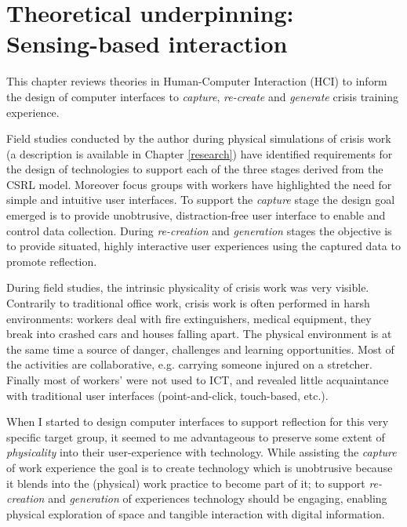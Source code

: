 \chapter{Theoretical underpinning:\\Sensing-based interaction}\label{interaction}


This chapter reviews theories in Human-Computer Interaction (HCI) to inform the design of computer interfaces to \emph{capture}, \emph{re-create} and \emph{generate} crisis training experience.

Field studies conducted by the author during physical simulations of crisis work (a description is available in Chapter \ref{research}) have identified requirements for the design of technologies to support each of the three stages derived from the CSRL model. Moreover focus groups with workers have highlighted the need for simple and intuitive user interfaces. To support the \emph{capture} stage the design goal emerged is to provide unobtrusive, distraction-free user interface to enable and control data collection. During \emph{re-creation} and \emph{generation} stages the objective is to provide situated, highly interactive user experiences using the captured data to promote reflection.

During field studies, the intrinsic physicality of crisis work was very visible. Contrarily to traditional office work, crisis work is often performed in harsh environments: workers deal with fire extinguishers, medical equipment, they break into crashed cars and houses falling apart. The physical environment is at the same time a source of danger, challenges and learning opportunities. Most of the activities are collaborative, e.g. carrying someone injured on a stretcher. Finally most of workers' were not used to ICT, and revealed little acquaintance with traditional user interfaces (point-and-click, touch-based, etc.).

When I started to design computer interfaces to support reflection for this very specific target group, it seemed to me advantageous to preserve some extent of \emph{physicality} into their user-experience with technology. While assisting the \emph{capture} of work experience the goal is to create technology which is unobtrusive because it blends into the (physical) work practice to become part of it; to support \emph{re-creation} and \emph{generation} of experiences technology should be engaging, enabling physical exploration of space and tangible interaction with digital information.

